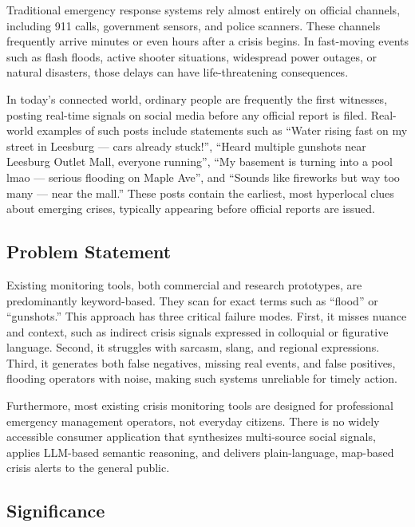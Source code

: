 \documentclass[conference]{IEEEtran}
\begin{document}
Traditional emergency response systems rely almost entirely on official channels,
including 911 calls, government sensors, and police scanners. These channels
frequently arrive minutes or even hours after a crisis begins. In fast-moving
events such as flash floods, active shooter situations, widespread power outages,
or natural disasters, those delays can have life-threatening consequences.

In today's connected world, ordinary people are frequently the first witnesses,
posting real-time signals on social media before any official report is filed.
Real-world examples of such posts include statements such as ``Water rising fast
on my street in Leesburg — cars already stuck!'', ``Heard multiple gunshots near
Leesburg Outlet Mall, everyone running'', ``My basement is turning into a pool
lmao — serious flooding on Maple Ave'', and ``Sounds like fireworks but way too
many — near the mall.'' These posts contain the earliest, most hyperlocal clues
about emerging crises, typically appearing before official reports are issued.

\subsection{Problem Statement}

Existing monitoring tools, both commercial and research prototypes, are
predominantly keyword-based. They scan for exact terms such as ``flood'' or
``gunshots.'' This approach has three critical failure modes. First, it misses
nuance and context, such as indirect crisis signals expressed in colloquial or
figurative language. Second, it struggles with sarcasm, slang, and regional
expressions. Third, it generates both false negatives, missing real events, and
false positives, flooding operators with noise, making such systems unreliable
for timely action.

Furthermore, most existing crisis monitoring tools are designed for professional
emergency management operators, not everyday citizens. There is no widely
accessible consumer application that synthesizes multi-source social signals,
applies LLM-based semantic reasoning, and delivers plain-language, map-based
crisis alerts to the general public.

\subsection{Significance}
\end{document}
